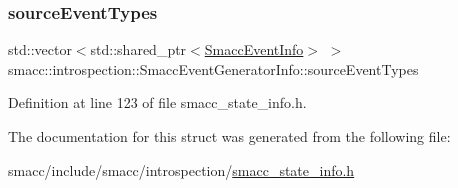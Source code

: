 \subsubsection{\texorpdfstring{source\+Event\+Types}{sourceEventTypes}}
{\footnotesize\ttfamily std\+::vector$<$std\+::shared\+\_\+ptr$<$\hyperlink{structsmacc_1_1introspection_1_1SmaccEventInfo}{Smacc\+Event\+Info}$>$ $>$ smacc\+::introspection\+::\+Smacc\+Event\+Generator\+Info\+::source\+Event\+Types}



Definition at line 123 of file smacc\+\_\+state\+\_\+info.\+h.



The documentation for this struct was generated from the following file\+:\begin{DoxyCompactItemize}
\item 
smacc/include/smacc/introspection/\hyperlink{smacc__state__info_8h}{smacc\+\_\+state\+\_\+info.\+h}\end{DoxyCompactItemize}
